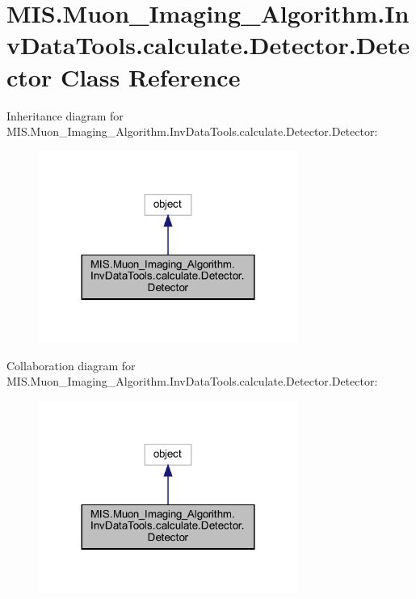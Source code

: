 \hypertarget{classMIS_1_1Muon__Imaging__Algorithm_1_1InvDataTools_1_1calculate_1_1Detector_1_1Detector}{}\section{M\+I\+S.\+Muon\+\_\+\+Imaging\+\_\+\+Algorithm.\+Inv\+Data\+Tools.\+calculate.\+Detector.\+Detector Class Reference}
\label{classMIS_1_1Muon__Imaging__Algorithm_1_1InvDataTools_1_1calculate_1_1Detector_1_1Detector}


Inheritance diagram for M\+I\+S.\+Muon\+\_\+\+Imaging\+\_\+\+Algorithm.\+Inv\+Data\+Tools.\+calculate.\+Detector.\+Detector\+:
\nopagebreak
\begin{figure}[H]
\begin{center}
\leavevmode
\includegraphics[width=240pt]{classMIS_1_1Muon__Imaging__Algorithm_1_1InvDataTools_1_1calculate_1_1Detector_1_1Detector__inherit__graph}
\end{center}
\end{figure}


Collaboration diagram for M\+I\+S.\+Muon\+\_\+\+Imaging\+\_\+\+Algorithm.\+Inv\+Data\+Tools.\+calculate.\+Detector.\+Detector\+:
\nopagebreak
\begin{figure}[H]
\begin{center}
\leavevmode
\includegraphics[width=240pt]{classMIS_1_1Muon__Imaging__Algorithm_1_1InvDataTools_1_1calculate_1_1Detector_1_1Detector__coll__graph}
\end{center}
\end{figure}

